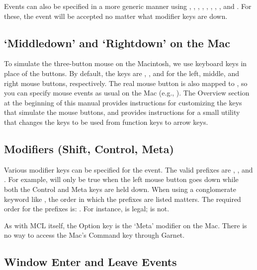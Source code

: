 Events can also be specified in a more generic manner using
, , ,
, , , ,
, and .  For these, the event will be
accepted no matter what modifier keys are down.


\subsection{`Middledown' and `Rightdown' on the Mac}
\label{mac-keys}
To simulate the three-button mouse on the Macintosh, we use keyboard
keys in place of the buttons.  By default, the keys are ,
, and  for the left, middle, and right mouse buttons,
respectively.  The real mouse button is also mapped to ,
so you can specify mouse events as usual on the Mac (e.g., ).
The Overview section at the beginning of this manual provides
instructions for customizing the keys that simulate the mouse buttons,
and provides instructions for a small utility that changes the keys to
be used from function keys to arrow keys.


\subsection{Modifiers (Shift, Control, Meta)}
Various modifier keys can be specified for the event.  The valid
prefixes are , , and .
For example,  will only be true
when the left mouse button goes down while both the Control and Meta
keys are held down.  When using a conglomerate keyword like
,
the order in which the prefixes are listed matters.  The required order for
the prefixes is: .  For instance,
 is legal;  is not.

As with MCL itself, the Option key is the `Meta' modifier on the Mac.
There is no way to access the Mac's Command key through Garnet.


\subsection{Window Enter and Leave Events}

